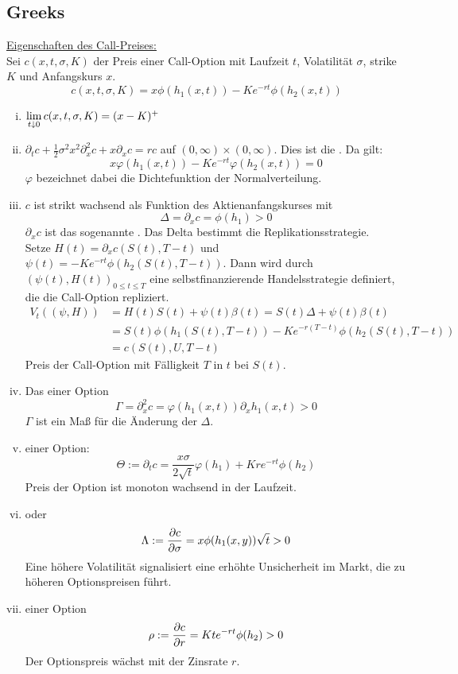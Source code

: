 \subsection{Greeks}
\label{sub:greeks}
\uline{Eigenschaften des Call-Preises:}\\
Sei $c(x,t,\sigma,K)$ der Preis einer Call-Option mit Laufzeit $t$, Volatilität $\sigma$, strike $K$ und Anfangskurs $x$.
\[
c(x,t,\sigma,K)= x\phi(h_1(x,t))-Ke^{-rt}\phi(h_2(x,t))
\]
\begin{enumerate}[(i)]
	\item $\lim\ablim{t\downarrow 0}c(x,t,\sigma,K)=(x-K)^+$
	\item $\partial_tc+\frac{1}{2}\sigma^2x^2\partial_x^2c+x\partial_xc=rc$ auf $(0,\infty)\times(0,\infty)$.
	Dies ist die .
	Da gilt:
	\[
	x\varphi(h_1(x,t))-Ke^{-rt}\varphi(h_2(x,t))=0
	\]
	$\varphi$ bezeichnet dabei die Dichtefunktion der Normalverteilung.
	\item $c$ ist strikt wachsend als Funktion des Aktienanfangskurses mit
	\[
	\Delta =\partial_xc=\phi(h_1)>0
	\]
	$\partial_xc$ ist das sogenannte .
	Das Delta bestimmt die Replikationsstrategie.\\
	Setze $H(t)=\partial_xc(S(t),T-t)$ und $\psi(t)=-Ke^{-rt}\phi(h_2(S(t),T-t))$.
	Dann wird durch $(\psi(t),H(t))_{0\le t\le T}$ eine selbstfinanzierende Handelsstrategie definiert, die die Call-Option repliziert.
	\begin{equation*}
	\begin{aligned}
		V_t((\psi,H)) &= H(t)S(t)+\psi(t)\beta(t)=S(t)\Delta+\psi(t)\beta(t)\\
		&= S(t)\phi(h_1(S(t),T-t))-Ke^{-r(T-t)}\phi(h_2(S(t),T-t))\\
		&= c(S(t),U,T-t)
	\end{aligned}
	\end{equation*}
	Preis der Call-Option mit Fälligkeit $T$ in $t$ bei $S(t)$.
	\item Das  einer Option
	\[
	\Gamma=\partial_x^2c=\varphi(h_1(x,t))\partial_xh_1(x,t)>0
	\]
	$\Gamma$ ist ein Maß für die Änderung der $\Delta$.
	\item {} einer Option:
	\[
	\Theta:= \partial_tc=\frac{x\sigma}{2\sqrt{t}}\varphi(h_1)+Kre^{-rt}\phi(h_2)
	\]
	Preis der Option ist monoton wachsend in der Laufzeit.
	\item {} oder 
	\[
	\Lambda := \frac{\partial c}{\partial \sigma} =x\phi(h_1(x,y))\sqrt{t}>0
	\]
	Eine höhere Volatilität signalisiert eine erhöhte Unsicherheit im Markt, die zu höheren Optionspreisen führt.
	\item {} einer Option
	\[
	\rho:= \frac{\partial c}{\partial r} =Kte^{-rt}\phi(h_2)>0
	\]
	Der Optionspreis wächst mit der Zinsrate $r$.
\end{enumerate}

